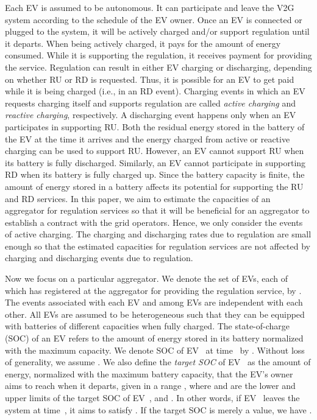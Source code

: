 \documentclass[journal]{IEEEtran}
\begin{document}
Each EV is assumed to be autonomous.  It can participate and leave the V2G
system according to the schedule of the EV owner.  Once an EV is connected or
plugged to the system, it will be actively charged and/or support regulation
until it departs.  When being actively charged, it pays for the amount of energy
consumed.  While it is supporting the regulation, it receives payment for
providing the service.  Regulation can result in either EV charging or
discharging, depending on whether RU or RD is requested.  
Thus, it is possible for an EV to get paid while it is being charged (i.e., in an
RD event). Charging events in which an EV requests
charging itself and supports regulation are called \textit{active charging} and
\textit{reactive charging}, respectively.  
A discharging event happens only
when an EV participates in supporting RU.  Both the residual energy
stored in the battery of the EV at the time it arrives and the energy charged
from active or reactive charging can be used to support RU.  However,
an EV cannot support RU when its battery is fully discharged.
Similarly, an EV cannot participate in supporting RD when its
battery is fully charged up.  Since the battery capacity is finite, the amount
of energy stored in a battery affects its potential for supporting the
RU and RD services.  In this paper, we aim to estimate
the capacities of an aggregator for regulation services so that it will be
beneficial for an aggregator to establish a contract with the grid operators.
Hence, we only consider the events of active charging.  The charging and
discharging rates due to regulation are small enough so that the estimated
capacities for regulation services are not affected by charging and discharging
events due to regulation.

Now we focus on a particular aggregator.  We denote the set of EVs, each of
which has registered at the aggregator for providing the regulation service, by
.  The events associated with each EV and among EVs are
independent with each other.  
All EVs are assumed to be heterogeneous such that
they can be equipped with batteries of different capacities when fully charged.  
The state-of-charge (SOC) of an EV refers to the amount of energy stored in its
battery normalized with the maximum capacity.  We denote SOC of EV~ at
time~ by .  Without loss of generality, we assume
.  We also define the
\textit{target SOC} of EV~ as the amount of energy, normalized with the
maximum battery capacity, that the EV's owner aims to reach when it departs,
given in a range , where 
and  are the lower and upper limits of the target SOC of
EV~, and .  In other
words, if EV~ leaves the system at time~, it aims to satisfy
.  If the target SOC is
merely a value, we have . 
 
\end{document}
